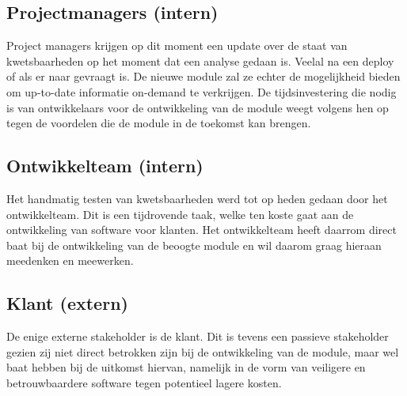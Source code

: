 \subsection{Projectmanagers (intern)}\label{subsec:projectmanagers-(intern)1}
Project managers krijgen op dit moment een update over de staat van kwetsbaarheden op het moment dat een analyse gedaan is. Veelal na een deploy of als er naar gevraagt is. De nieuwe module zal ze echter de mogelijkheid bieden om up-to-date informatie on-demand te verkrijgen.
De tijdsinvestering die nodig is van ontwikkelaars voor de ontwikkeling van de module weegt volgens hen op tegen de voordelen die de module in de toekomst kan brengen.

\subsection{Ontwikkelteam (intern)}\label{subsec:ontwikkelteam-(intern)1}
Het handmatig testen van kwetsbaarheden werd tot op heden gedaan door het ontwikkelteam. Dit is een tijdrovende taak, welke ten koste gaat aan de ontwikkeling van software voor klanten. Het ontwikkelteam heeft daarrom direct baat bij de ontwikkeling van de beoogte module en wil daarom graag hieraan meedenken en meewerken.

\subsection{Klant (extern)}\label{subsec:klant-(extern)1}
De enige externe stakeholder is de klant. Dit is tevens een passieve stakeholder gezien zij niet direct betrokken zijn bij de ontwikkeling van de module, maar wel baat hebben bij de uitkomst hiervan, namelijk in de vorm van veiligere en betrouwbaardere software tegen potentieel lagere kosten.

